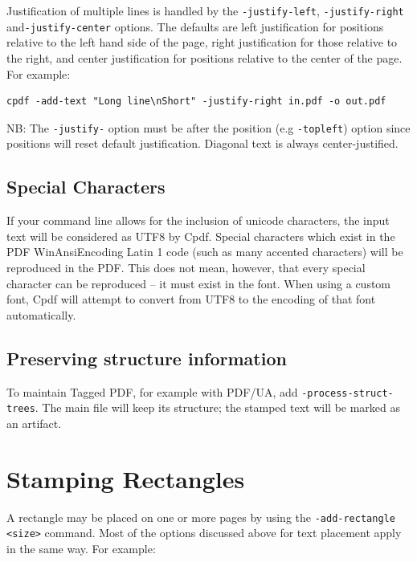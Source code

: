 \documentclass{book}
\begin{document}
\noindent Justification of multiple lines is handled by the \texttt{-justify-left}, 
\texttt{-justify-right} and\linebreak \texttt{-justify-center} options. The defaults are
left justification for positions relative to the left hand side of the page,
right justification for those relative to the right, and center justification
for positions relative to the center of the page. For example:

\begin{framed}
  \noindent\small\begin{verbatim}
cpdf -add-text "Long line\nShort" -justify-right in.pdf -o out.pdf\end{verbatim}
\end{framed}

\noindent NB: The \texttt{-justify-} option must be after the position (e.g \texttt{-topleft}) option since positions will reset default justification. Diagonal text is always center-justified.

\subsection{Special Characters}

If your command line allows for the inclusion of unicode characters, the input
text will be considered as UTF8 by Cpdf. Special characters which exist in the
PDF WinAnsiEncoding Latin 1 code (such as many accented characters) will be
reproduced in the PDF. This does not mean, however, that every special
character can be reproduced -- it must exist in the font. When using a custom
font, Cpdf will attempt to convert from UTF8 to the encoding of that font
automatically.

\subsection{Preserving structure information}

To maintain Tagged PDF, for example with PDF/UA, add \texttt{-process-struct-trees}. The main file will keep its structure; the stamped text will be marked as an artifact.

\section{Stamping Rectangles}

A rectangle may be placed on one or more pages by using the \texttt{-add-rectangle <size>} command. Most of the options discussed above for text placement apply in the same way. For example:
\end{document}
